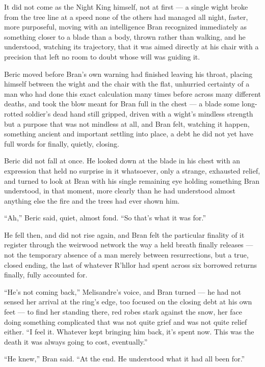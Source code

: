 \sceneBreak

It did not come as the Night King himself, not at first — a single wight broke from the tree line at a speed none of the others had managed all night, faster, more purposeful, moving with an intelligence Bran recognized immediately as something closer to a blade than a body, thrown rather than walking, and he understood, watching its trajectory, that it was aimed directly at his chair with a precision that left no room to doubt whose will was guiding it.

Beric moved before Bran’s own warning had finished leaving his throat, placing himself between the wight and the chair with the flat, unhurried certainty of a man who had done this exact calculation many times before across many different deaths, and took the blow meant for Bran full in the chest — a blade some long-rotted soldier’s dead hand still gripped, driven with a wight’s mindless strength but a purpose that was not mindless at all, and Bran felt, watching it happen, something ancient and important settling into place, a debt he did not yet have full words for finally, quietly, closing.

Beric did not fall at once. He looked down at the blade in his chest with an expression that held no surprise in it whatsoever, only a strange, exhausted relief, and turned to look at Bran with his single remaining eye holding something Bran understood, in that moment, more clearly than he had understood almost anything else the fire and the trees had ever shown him.

“Ah,” Beric said, quiet, almost fond. “So that’s what it was for.”

He fell then, and did not rise again, and Bran felt the particular finality of it register through the weirwood network the way a held breath finally releases — not the temporary absence of a man merely between resurrections, but a true, closed ending, the last of whatever R’hllor had spent across six borrowed returns finally, fully accounted for.

“He’s not coming back,” Melisandre’s voice, and Bran turned — he had not sensed her arrival at the ring’s edge, too focused on the closing debt at his own feet — to find her standing there, red robes stark against the snow, her face doing something complicated that was not quite grief and was not quite relief either. “I feel it. Whatever kept bringing him back, it’s spent now. This was the death it was always going to cost, eventually.”

“He knew,” Bran said. “At the end. He understood what it had all been for.”

